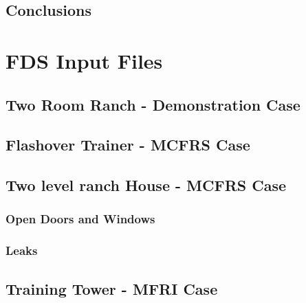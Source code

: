 \documentclass[11pt]{book}
\newcommand{\fdsinput}[1]{
{
\scriptsize

}
}
\begin{document}
\section{Conclusions}



\appendix

\chapter{FDS Input Files}

\section{Two Room Ranch - Demonstration Case}
\fdsinput{Demonstrations/2Room_Ranch/ranch_00.fds}

\section{Flashover Trainer - MCFRS Case}
\fdsinput{MCFRS/MCFRS_Flashover/MCFRS_Flashover_00.fds}

\section{Two level ranch House - MCFRS Case}
\subsection{Open Doors and Windows}
\fdsinput{MCFRS/MCFRS_Tower/MCFRS_Tower_00.fds}

\subsection{Leaks}
\fdsinput{MCFRS/MCFRS_Tower/MCFRS_Tower_01.fds}

\section{Training Tower - MFRI Case}
\fdsinput{MFRI/MFRI_Training_Tower/MFRI_Training_Tower_00.fds}
\end{document}
